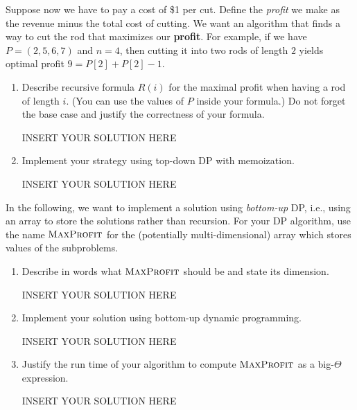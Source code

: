 Suppose now we have to pay a cost of \$1 per cut. Define the \emph{profit} we make as the revenue minus the total cost of cutting. We want an algorithm that finds a way to cut the rod that maximizes our \textbf{profit}. For example, if we have $P = (2,5,6,7)$ and $n=4$, then cutting it into two rods of length $2$ yields optimal profit $9=P[2]+P[2]-1$.

\begin{enumerate}
    \item Describe recursive formula $R(i)$ for the maximal profit when having a rod of length $i$. (You can use the values of $P$ inside your formula.) Do not forget the base case and justify the correctness of your formula. 
\begin{solution}   INSERT YOUR SOLUTION HERE   \end{solution}

    \item Implement your strategy using top-down DP with memoization.
\begin{solution}   INSERT YOUR SOLUTION HERE   \end{solution}
\end{enumerate} 

In the following, we want to implement a solution using \emph{bottom-up} DP, i.e., using an array to store the solutions rather than recursion.
For your DP algorithm, use the name $\textsc{MaxProfit}$ for the (potentially multi-dimensional) array which stores values of the subproblems.
\begin{enumerate}[resume]   
    \item Describe in words what $\textsc{MaxProfit}$ should be and state its dimension.
\begin{solution}   INSERT YOUR SOLUTION HERE   \end{solution}

    \item Implement your solution using bottom-up dynamic programming. 
\begin{solution}   INSERT YOUR SOLUTION HERE   \end{solution}

    \item Justify the run time of your algorithm to compute $\textsc{MaxProfit}$ as a big-$\Theta$ expression.
    
\begin{solution}   INSERT YOUR SOLUTION HERE   \end{solution}
\end{enumerate}



